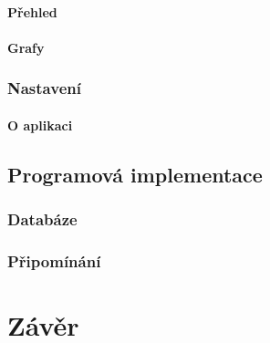 \documentclass[a4paper,12pt]{report}
\begin{document}
\subsubsection{Přehled}
\subsubsection{Grafy}
\subsection{Nastavení}
\subsubsection{O aplikaci}
\section{Programová implementace}
\subsection{Databáze}
\subsection{Připomínání}

\chapter*{Závěr}




\end{document}
